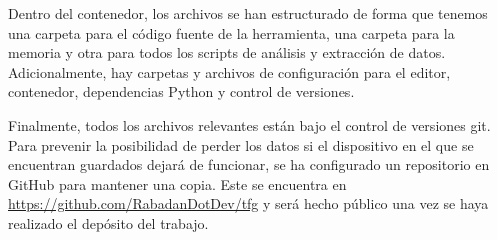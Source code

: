Dentro del contenedor, los archivos se han estructurado de forma que tenemos una carpeta para el código fuente de la herramienta, una carpeta para la memoria y otra para todos los scripts de análisis y extracción de datos. Adicionalmente, hay carpetas y archivos de configuración para el editor, contenedor, dependencias Python y control de versiones.

Finalmente, todos los archivos relevantes están bajo el control de versiones git. Para prevenir la posibilidad de perder los datos si el dispositivo en el que se encuentran guardados dejará de funcionar, se ha configurado un repositorio en GitHub para mantener una copia. Este se encuentra en \url{https://github.com/RabadanDotDev/tfg} y será hecho público una vez se haya realizado el depósito del trabajo.

